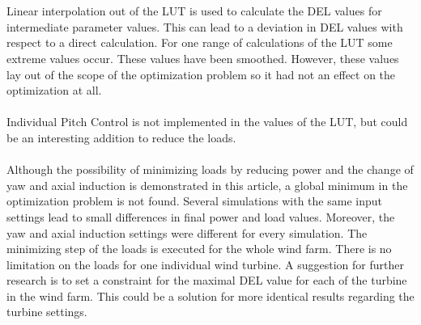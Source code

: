 \\ 
\\
Linear interpolation out of the LUT is used to calculate the DEL values for intermediate parameter values. This can lead to a deviation in DEL values with respect to a direct calculation. 
For one range of calculations of the LUT some extreme values occur. These values have been smoothed. However, these values lay out of the scope of the optimization problem so it had not an effect on the optimization at all.   
\\
\\
Individual Pitch Control is not implemented in the values of the LUT, but could be an interesting addition to reduce the loads.\cite{Wilson2017}  
\\
\\
Although the possibility of minimizing loads by reducing power and the change of yaw and axial induction is demonstrated in this article, a global minimum in the optimization problem is not found. Several simulations with the same input settings lead to small differences in final power and load values. Moreover, the yaw and axial induction settings were different for every simulation. \newline
The minimizing step of the loads is executed for the whole wind farm. There is no limitation on the loads for one individual wind turbine.
A suggestion for further research is to set a constraint for the maximal DEL value for each of the turbine in the wind farm. This could be a solution for more identical results regarding the turbine settings.

  
  
	   

